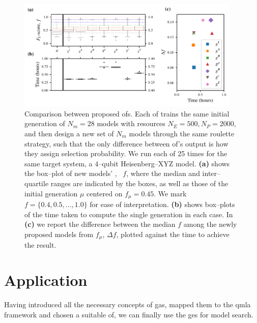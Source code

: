 \begin{figure}
    \centering
    \includegraphics[width=0.95\textwidth]{theoretical_study/figures/objective_fnc_comparison.pdf}
    \caption[Comparison between proposed \glspl{of}.]{
        Comparison between proposed \glspl{of}. 
        Each \gls{of} trains the same initial generation of $N_m=28$ models with resources
        $N_E=500, N_P=2000$, and then design a new set of $N_m$ models through 
        the same roulette strategy, such that the only difference between \gls{of}'s output 
        is how they assign selection probability.
        We run each \gls{of} 25 times for the same target system, 
            a $4$--qubit Heisenberg--XYZ model. 
        \textbf{(a)} shows the box--plot of new models' \fs, \ $f$, 
            where the median and inter--quartile ranges are indicated by the boxes,
            as well as those of the initial generation $\mu$ centered on $f_{\mu}=0.45$.
            We mark $f=\{0.4, 0.5, ..., 1.0\}$ for ease of interpretation. 
        \textbf{(b)} shows box--plots of the time taken to compute the single generation in each case.
        In \textbf{(c)} we report the difference between the median $f$ among the 
            newly proposed models from $f_{\mu}$, $\Delta f$,
            plotted against the time to achieve the result. 
    }
    \label{fig:obj_fnc_comparison}
\end{figure}


\section{Application}
Having introduced all the necessary concepts of \glspl{ga}, 
    mapped them to the \gls{qmla} framework and chosen a suitable 
    \gls{of}, we can finally use the \gls{ges} for model search. 

